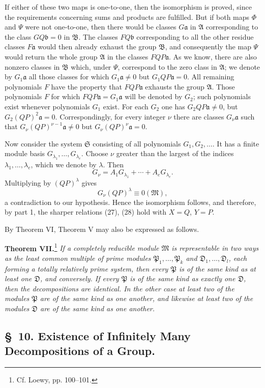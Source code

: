 \documentclass[11pt]{article}
\newcommand{\mM}{\mathfrak{M}}
\newcommand{\mA}{\mathfrak{A}}
\newcommand{\mB}{\mathfrak{B}}
\newcommand{\ma}{\mathfrak{a}}
\newcommand{\mb}{\mathfrak{b}}
\providecommand{\mP}{\mathfrak{P}}
\providecommand{\mS}{\mathfrak{S}}
\providecommand{\mD}{\mathfrak{D}}
\begin{document}
If either of these two maps is one-to-one, then the isomorphism is proved, since the requirements concerning sums and products are fulfilled. But if both maps $\Phi$ and $\Psi$ were not one-to-one, then there would be classes $G\ma$ in $\mA$ corresponding to the class $GQ\mb=0$ in $\mB$. The classes $FQ\mb$ corresponding to all the other residue classes $F\ma$ would then already exhaust the group $\mB$, and consequently the map $\Psi$ would return the whole group $\mA$ in the classes $FQP\ma$. As we know, there are also nonzero classes in $\mB$ which, under $\Psi$, correspond to the zero class in $\mA$; we denote by $G_1\ma$ all those classes for which $G_1\ma\ne0$ but $G_1QP\ma=0$. All remaining polynomials $F$ have the property that $FQP\ma$ exhausts the group $\mA$. Those polynomials $F$ for which $FQP\ma=G_1\ma$ will be denoted by $G_2$; such polynomials exist whenever polynomials $G_1$ exist. For each $G_2$ one has $G_2QP\ma\ne0$, but $G_2(QP)^2\ma=0$. Correspondingly, for every integer $\nu$ there are classes $G_\nu\ma$ such that $G_\nu(QP)^{\nu-1}\ma\ne0$ but $G_\nu(QP)^\nu\ma=0$.

Now consider the system $\mS$ consisting of all polynomials $G_1,G_2,
\ldots$. It has a finite module basis $G_{\lambda_1},\ldots,G_{\lambda_e}$. Choose $\nu$ greater than the largest of the indices $\lambda_1,
\ldots,\lambda_e$, which we denote by $\lambda$. Then
\[
 G_\nu=A_1G_{\lambda_1}+\cdots+A_eG_{\lambda_e}.
\]
Multiplying by $(QP)^\lambda$ gives
\[
 G_\nu(QP)^\lambda\equiv0(\mM),
\]
a contradiction to our hypothesis. Hence the isomorphism follows, and therefore, by part 1, the sharper relations (27), (28) hold with $X=Q$, $Y=P$.

By Theorem VI, Theorem V may also be expressed as follows.

\textbf{Theorem VII.}\footnote{Cf. Loewy, pp. 100--101.} \emph{If a completely reducible module $\mM$ is representable in two ways as the least common multiple of prime modules $\mP_1,
\ldots,\mP_k$ and $\mD_1,
\ldots,\mD_l$, each forming a totally relatively prime system, then every $\mP$ is of the same kind as at least one $\mD$, and conversely. If every $\mP$ is of the same kind as exactly one $\mD$, then the decompositions are identical. In the other case at least two of the modules $\mP$ are of the same kind as one another, and likewise at least two of the modules $\mD$ are of the same kind as one another.}
\clearpage
\setcounter{footnote}{19}
\subsection*{\S~10. Existence of Infinitely Many Decompositions of a Group.}
\end{document}
